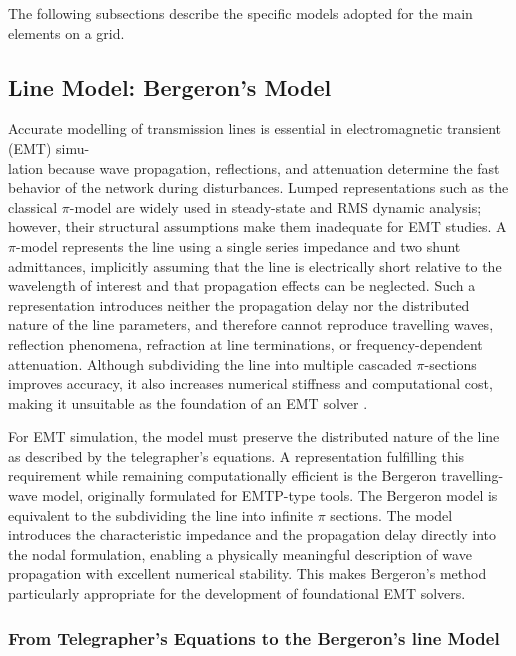 The following subsections describe the specific models adopted for the main elements on a grid.



\subsection{Line Model: Bergeron's Model}

Accurate modelling of transmission lines is essential in electromagnetic transient (EMT) simu-\\lation because wave propagation, reflections, 
and attenuation determine the fast behavior of the network during disturbances. Lumped representations such as the classical $\pi$-model 
are widely used in steady-state and RMS dynamic analysis; however, their structural assumptions make them inadequate for EMT studies. 
A $\pi$-model represents the line using a single series impedance and two shunt admittances, implicitly assuming that the line is electrically 
short relative to the wavelength of interest and that propagation effects can be neglected. 
Such a representation introduces neither the propagation delay nor the distributed nature of the line parameters, and therefore cannot 
reproduce travelling waves, reflection phenomena, refraction at line terminations, or frequency-dependent attenuation.
 Although subdividing the line into multiple cascaded $\pi$-sections improves accuracy, it also increases numerical stiffness 
 and computational cost, making it unsuitable as the foundation of an EMT solver \cite{Dommel_EMTP_Theory_Book_1986}.

For EMT simulation, the model must preserve the distributed nature of the line as described by the telegrapher's equations. 
A representation fulfilling this requirement while remaining computationally efficient is the Bergeron travelling-wave model, originally 
formulated for EMTP-type tools. The Bergeron model is equivalent to the subdividing the line into infinite $\pi$ sections. The model introduces the characteristic impedance and the propagation delay directly into the nodal formulation, 
enabling a physically meaningful description of wave propagation with excellent numerical stability. This makes Bergeron's method particularly 
appropriate for the development of foundational EMT solvers.

\subsubsection{From Telegrapher's Equations to the Bergeron's line Model}

